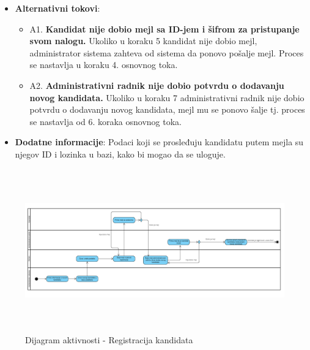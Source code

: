 \begin{itemize}
      \newpage
  \item \textbf{Alternativni tokovi}:
      \begin{itemize}
        \item A1. \textbf{Kandidat nije dobio mejl sa ID-jem i šifrom za pristupanje svom nalogu.}
        Ukoliko u koraku 5 kandidat nije dobio mejl, administrator sistema zahteva od sistema da ponovo pošalje mejl. Proces se nastavlja u koraku 4. osnovnog toka.
        \item A2. \textbf{Administrativni radnik nije dobio potvrdu o dodavanju novog kandidata.}
        Ukoliko u koraku 7 administrativni radnik nije dobio potvrdu o dodavanju novog kandidata, mejl mu se ponovo šalje tj. proces se nastavlja od 6. koraka osnovnog toka.
      \end{itemize}


  \item \textbf{Dodatne informacije}:\newline
  Podaci koji se prosleđuju kandidatu putem mejla su njegov ID i lozinka u bazi, kako bi mogao da se uloguje.
\end{itemize}

\begin{figure}[H]
  \begin{center}
      \includegraphics[width=140mm, height=70mm]{Diagrams/dijagram_aktivnosti_registracija_kandidata.png}
  \end{center}
  \caption {Dijagram aktivnosti - Registracija kandidata}
  \label{activity_registracija}

\end{figure}
